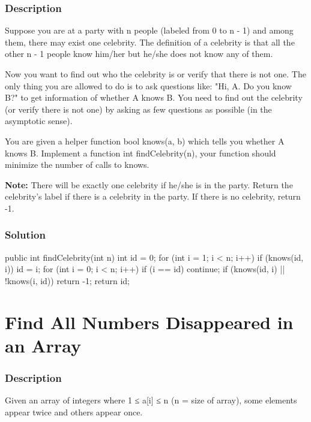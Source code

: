 \subsubsection{Description}
Suppose you are at a party with n people (labeled from 0 to n - 1) and among them, there may exist one celebrity. The definition of a celebrity is that all the other n - 1 people know him/her but he/she does not know any of them.

Now you want to find out who the celebrity is or verify that there is not one. The only thing you are allowed to do is to ask questions like: "Hi, A. Do you know B?" to get information of whether A knows B. You need to find out the celebrity (or verify there is not one) by asking as few questions as possible (in the asymptotic sense).

You are given a helper function bool knows(a, b) which tells you whether A knows B. Implement a function int findCelebrity(n), your function should minimize the number of calls to knows.

\textbf{Note:} There will be exactly one celebrity if he/she is in the party. Return the celebrity's label if there is a celebrity in the party. If there is no celebrity, return -1.

\subsubsection{Solution}

\begin{Code}
public int findCelebrity(int n) {
    int id = 0;
    for (int i = 1; i < n; i++) {
        if (knows(id, i)) {
            id = i;
        }
    }
    for (int i = 0; i < n; i++) {
        if (i == id) {
            continue;
        }
        if (knows(id, i) || !knows(i, id)) {
            return -1;
        }
    }
    return id;
}
\end{Code}

\newpage

\section{Find All Numbers Disappeared in an Array} %

\subsubsection{Description}
Given an array of integers where 1 ≤ a[i] ≤ n (n = size of array), some elements appear twice and others appear once.

